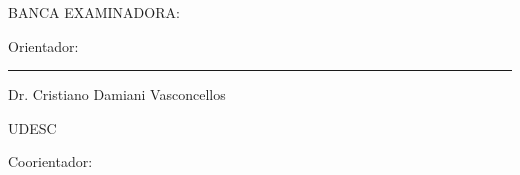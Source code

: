 

%
% 
%
\begin{folhadeaprovacao}



	\begin{center}
		{\selectfont\MakeTextUppercase{\normalsize\imprimirautor}}
	\end{center}
	\vfill

	\vfill
	\begin{center}
		{\selectfont\MakeTextUppercase{\imprimirtitulo}}
	\end{center}
	\vfill




	\vfill

	\begin{center}
		{\selectfont BANCA EXAMINADORA: }
		\vspace*{1.75cm}
	\end{center}

	{Orientador:}

	\begin{center}
		\begin{minipage}{8.75cm}
			\begin{flushleft}
				\rule{8.75cm}{0.1mm}

				Dr. Cristiano Damiani Vasconcellos \par
				UDESC
			\end{flushleft}
		\end{minipage}
	\end{center}

	\vspace*{\baselineskip}
	{Coorientador:}


\end{folhadeaprovacao}
